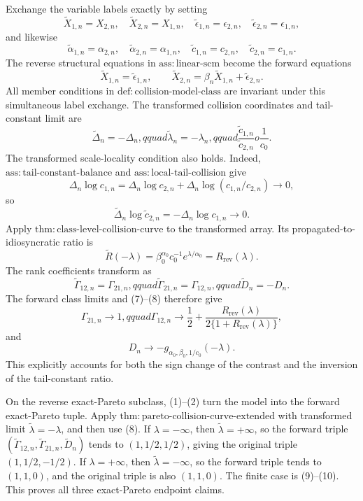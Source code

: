 Exchange the variable labels exactly by setting
\[
\widetilde X_{1,n}=X_{2,n},\quad
\widetilde X_{2,n}=X_{1,n},\quad
\widetilde\epsilon_{1,n}=\epsilon_{2,n},\quad
\widetilde\epsilon_{2,n}=\epsilon_{1,n},
\tag{1}
\]
and likewise
\[
\widetilde\alpha_{1,n}=\alpha_{2,n},\quad
\widetilde\alpha_{2,n}=\alpha_{1,n},\quad
\widetilde c_{1,n}=c_{2,n},\quad
\widetilde c_{2,n}=c_{1,n}.
\tag{2}
\]
The reverse structural equations in \(\mathrm{ass{:}linear\text{-}scm}\) become the forward equations
\[
\widetilde X_{1,n}=\widetilde\epsilon_{1,n},
\qquad
\widetilde X_{2,n}=\beta_n\widetilde X_{1,n}+\widetilde\epsilon_{2,n}.
\tag{3}
\]
All member conditions in \(\mathrm{def{:}collision\text{-}model\text{-}class}\) are invariant under this simultaneous label exchange. The transformed collision coordinates and tail-constant limit are
\[
\widetilde\Delta_n=-\Delta_n,qquad
\widetilde\lambda_n=-\lambda_n,qquad
\frac{\widetilde c_{1,n}}{\widetilde c_{2,n}}  o\frac1{c_0}.
\tag{4}
\]
The transformed scale-locality condition also holds. Indeed, \(\mathrm{ass{:}tail\text{-}constant\text{-}balance}\) and \(\mathrm{ass{:}local\text{-}tail\text{-}collision}\) give
\[
\Delta_n\log c_{1,n}
=\Delta_n\log c_{2,n}+\Delta_n\log(c_{1,n}/c_{2,n})\to0,
\tag{5}
\]
so
\[
\widetilde\Delta_n\log\widetilde c_{2,n}
=-\Delta_n\log c_{1,n}\to0.
\tag{6}
\]
Apply \(\mathrm{thm{:}class\text{-}level\text{-}collision\text{-}curve}\) to the transformed array. Its propagated-to-idiosyncratic ratio is
\[
\widetilde R(-\lambda)
=\beta_0^{\alpha_0}c_0^{-1}e^{\lambda/\alpha_0}
=R_{\mathrm{rev}}(\lambda).
\tag{7}
\]
The rank coefficients transform as
\[
\widetilde\Gamma_{12,n}=\Gamma_{21,n},qquad
\widetilde\Gamma_{21,n}=\Gamma_{12,n},qquad
\widetilde D_n=-D_n.
\tag{8}
\]
The forward class limits and (7)--(8) therefore give
\[
\Gamma_{21,n}\to1,qquad
\Gamma_{12,n}\to\frac12+\frac{R_{\mathrm{rev}}(\lambda)}{2\{1+R_{\mathrm{rev}}(\lambda)\}},
\tag{9}
\]
and
\[
D_n\to-g_{\alpha_0,\beta_0,1/c_0}(-\lambda).
\tag{10}
\]
This explicitly accounts for both the sign change of the contrast and the inversion of the tail-constant ratio.

On the reverse exact-Pareto subclass, (1)--(2) turn the model into the forward exact-Pareto tuple. Apply \(\mathrm{thm{:}pareto\text{-}collision\text{-}curve\text{-}extended}\) with transformed limit \(\widetilde\lambda=-\lambda\), and then use (8). If \(\lambda=-\infty\), then \(\widetilde\lambda=+\infty\), so the forward triple \((\widetilde\Gamma_{12,n},\widetilde\Gamma_{21,n},\widetilde D_n)\) tends to \((1,1/2,1/2)\), giving the original triple \((1,1/2,-1/2)\). If \(\lambda=+\infty\), then \(\widetilde\lambda=-\infty\), so the forward triple tends to \((1,1,0)\), and the original triple is also \((1,1,0)\). The finite case is (9)--(10). This proves all three exact-Pareto endpoint claims.